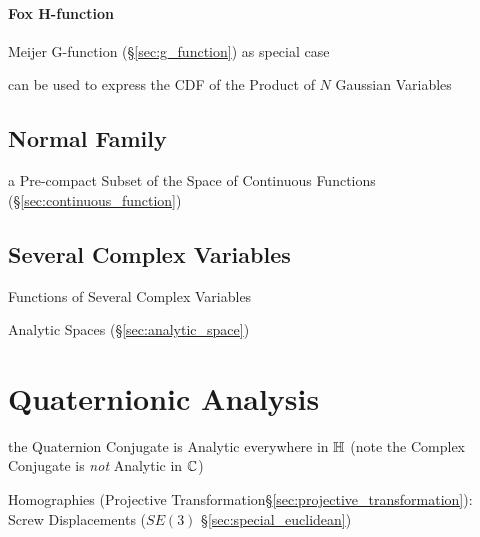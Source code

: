 \paragraph{Fox H-function}\label{sec:h_function}\hfill

Meijer G-function (\S\ref{sec:g_function}) as special case

can be used to express the CDF of the Product of $N$ Gaussian Variables



\subsection{Normal Family}\label{sec:normal_family}

a Pre-compact Subset of the Space of Continuous Functions
(\S\ref{sec:continuous_function})



\subsection{Several Complex Variables}\label{sec:several_complex_variables}

Functions of Several Complex Variables

Analytic Spaces (\S\ref{sec:analytic_space})



\section{Quaternionic Analysis}\label{sec:quaternionic_analysis}

the Quaternion Conjugate is Analytic everywhere in $\mathbb{H}$
(note the Complex Conjugate is \emph{not} Analytic in $\mathbb{C}$)

Homographies (Projective Transformation\S\ref{sec:projective_transformation}):
Screw Displacements ($SE(3)$ \S\ref{sec:special_euclidean})



